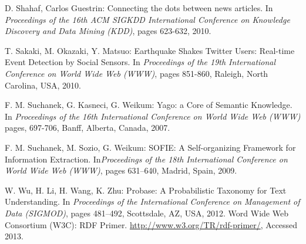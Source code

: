 \documentclass[11pt,a4paper]{article}
\begin{document}
\begin{thebibliography}{99}
  D. Shahaf, Carlos Guestrin: Connecting the dots between news articles.  In \textit{Proceedings of the 16th ACM SIGKDD International Conference on Knowledge
Discovery and Data Mining (KDD)}, pages 623-632, 2010.

  T. Sakaki, M. Okazaki, Y.  Matsuo: Earthquake Shakes Twitter Users: Real-time Event Detection by Social Sensors.  In \textit{Proceedings  of the 19th International Conference
 on World Wide Web (WWW)}, pages 851-860, Raleigh, North Carolina, USA, 2010.
 
 F. M. Suchanek, G. Kasneci, G. Weikum: Yago: a Core of Semantic Knowledge. In \textit{Proceedings  of the 16th International Conference
 on World Wide Web (WWW)} pages, 697-706,  Banff, Alberta, Canada, 2007.

 F. M. Suchanek, M. Sozio, G. Weikum: SOFIE: A Self-organizing Framework for Information Extraction. In\textit{Proceedings  of the 18th International Conference
on World Wide Web (WWW)}, pages 631--640, Madrid, Spain, 2009.
  
%  
%
%
 W. Wu, H. Li, H. Wang, K. Zhu:
Probase: A Probabilistic Taxonomy for Text Understanding. In \textit{Proceedings of the International Conference on Management of Data (SIGMOD)}, pages 481--492, Scottsdale, AZ, USA, 2012.
 Word Wide Web Consortium (W3C): RDF Primer. \url{http://www.w3.org/TR/rdf-primer/}, Accessed  2013.


\end{thebibliography}
\end{document}
